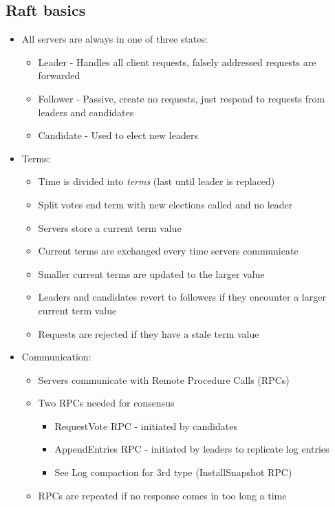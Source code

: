 \documentclass[10pt,a4paper]{article}
\begin{document}
	\subsection{Raft basics}
	\begin{itemize}
		\item All servers are always in one of three states:
		\begin{itemize}
			\item Leader - Handles all client requests, falsely addressed requests are forwarded
			\item Follower - Passive, create no requests, just respond to requests from leaders and candidates
			\item Candidate - Used to elect new leaders
		\end{itemize}
		\item Terms:
		\begin{itemize}
			\item Time is divided into \textit{terms} (last until leader is replaced)
			\item Split votes end term with new elections called and no leader
			\item Servers store a current term value
			\item Current terms are exchanged every time servers communicate
			\item Smaller current terms are updated to the larger value
			\item Leaders and candidates revert to followers if they encounter a larger current term value
			\item Requests are rejected if they have a stale term value
		\end{itemize}
		\item Communication:
		\begin{itemize}
			\item Servers communicate with Remote Procedure Calls (RPCs)
			\item Two RPCs needed for consensus
			\begin{itemize}
				\item RequestVote RPC - initiated by candidates
				\item AppendEntries RPC - initiated by leaders to replicate log entries
				\item See Log compaction for 3rd type (InstallSnapshot RPC)
			\end{itemize}
			\item RPCs are repeated if no response comes in too long a time
		\end{itemize}
	\end{itemize}
\end{document}

